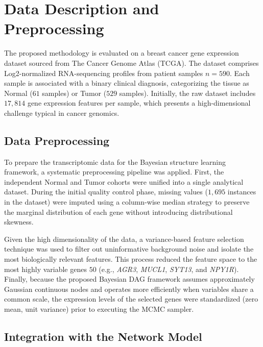 \documentclass[twoside]{article}
\begin{document}
\section{Data Description and Preprocessing}
\label{sec:data}
\vspace{-0.3cm}
The proposed methodology is evaluated on a breast cancer gene expression dataset sourced from The Cancer Genome Atlas (TCGA). The dataset comprises Log2-normalized RNA-sequencing profiles from  patient samples $n=590$. Each sample is associated with a binary clinical diagnosis, categorizing the tissue as Normal ($61$ samples) or Tumor ($529$ samples). Initially, the raw dataset includes $17,814$ gene expression features per sample, which presents a high-dimensional challenge typical in cancer genomics.

\vspace{-0.7cm}\subsection{Data Preprocessing}
To prepare the transcriptomic data for the Bayesian structure learning framework, a systematic preprocessing pipeline was applied. First, the independent Normal and Tumor cohorts were unified into a single analytical dataset. During the initial quality control phase, missing values ($1,695$ instances in the dataset) were imputed using a column-wise median strategy to preserve the marginal distribution of each gene without introducing distributional skewness.
 
Given the high dimensionality of the data, a variance-based feature selection technique was used to filter out uninformative background noise and isolate the most biologically relevant features. This process reduced the feature space to the most highly variable genes $50$ (e.g., \textit{AGR3}, \textit{MUCL1}, \textit{SYT13}, and \textit{NPY1R}). Finally, because the proposed Bayesian DAG framework assumes approximately Gaussian continuous nodes and operates more efficiently when variables share a common scale, the expression levels of the selected genes were standardized (zero mean, unit variance) prior to executing the MCMC sampler.

\vspace{-0.6cm}\subsection{Integration with the Network Model}
\end{document}
